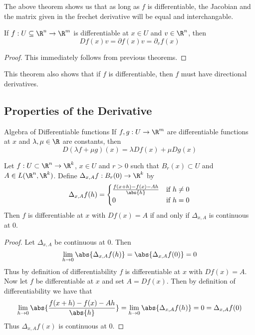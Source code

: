 \documentclass[a4paper]{article}
\begin{document}
The above theorem shows us that as long as $f$ is differentiable, the Jacobian and the matrix given in the frechet derivative will be equal and interchangable. 

\begin{lmm}{}{} If $f:U\subseteq\R^n\to\R^m$ is differentiable at $x\in U$ and $v\in\R^n$, then $$Df(x)v=\partial f(x)v=\partial_vf(x)$$ \tcbline
\begin{proof}
This immediately follows from previous theorems. 
\end{proof}
\end{lmm}

This theorem also shows that if $f$ is differentiable, then $f$ must have directional derivatives. 

\subsection{Properties of the Derivative}
\begin{thm}{Algebra of Differentiable functions}{} If $f,g:U\to\R^m$ are differentiable functions at $x $ and $\lambda,\mu\in\R$ are constants, then $$D(\lambda f+\mu g)(x )=\lambda Df(x )+\mu Dg(x )$$
\end{thm}

\begin{lmm}{}{} Let $f:U\subset\R^n\to\R^k$, $x\in U$ and $r>0$ such that $B_r(x)\subset U$ and $A\in L(\R^n,\R^k)$. Define $\Delta_{x,A}f:B_r(0)\to\R^k$ by $$\Delta_{x,A}f(h)=\begin{cases}
\frac{f(x+h)-f(x)-Ah}{\abs{h}} & \text{if $h\neq0$}\\
0 & \text{if $h=0$}
\end{cases}$$
Then $f$ is differentiable at $x$ with $Df(x)=A$ if and only if $\Delta_{x,A}$ is continuous at $0$. \tcbline
\begin{proof}
Let $\Delta_{x,A}$ be continuous at $0$. Then $$\lim_{h\to 0}\abs{\Delta_{x,A}f(h)}=\abs{\Delta_{x,A}f(0)}=0$$ Thus by definition of differentiability $f$ is differentiable at $x$ with $Df(x)=A$. \linebreak\linebreak
Now let $f$ be differentiable at $x$ and set $A=Df(x)$. Then by definition of differentiability we have that $$\lim_{h\to 0}\abs{\frac{f(x+h)-f(x)-Ah}{\abs{h}}}=\lim_{h\to 0}\abs{\Delta_{x,A}f(h)}=0=\Delta_{x,A}f(0)$$ Thus $\Delta_{x,A}f(x)$ is continuous at $0$. 
\end{proof}
\end{lmm}
\end{document}
